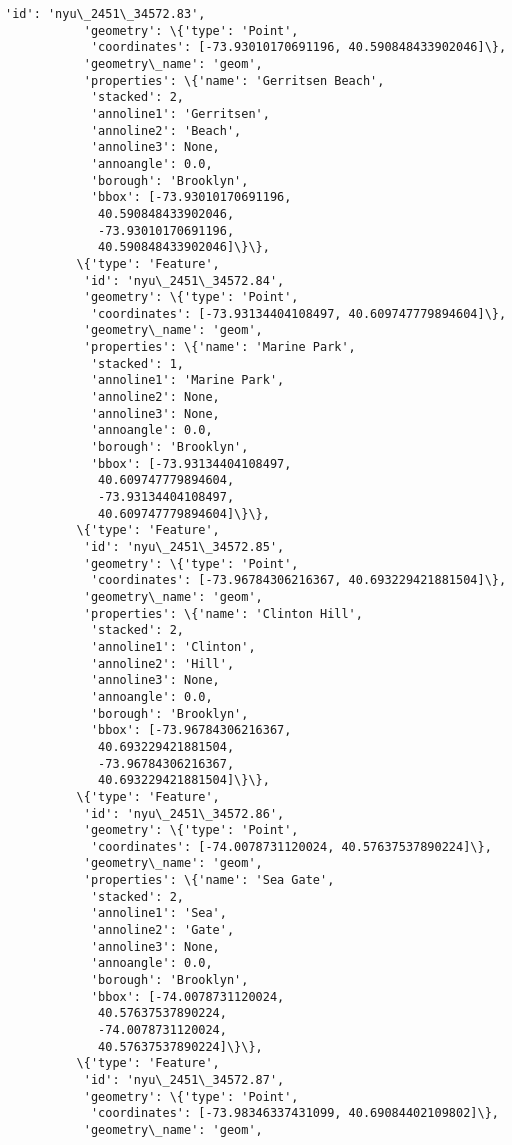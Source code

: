 \documentclass[11pt]{article}
\begin{document}
\begin{Verbatim}[commandchars=\\\{\}]
           'id': 'nyu\_2451\_34572.83',
           'geometry': \{'type': 'Point',
            'coordinates': [-73.93010170691196, 40.590848433902046]\},
           'geometry\_name': 'geom',
           'properties': \{'name': 'Gerritsen Beach',
            'stacked': 2,
            'annoline1': 'Gerritsen',
            'annoline2': 'Beach',
            'annoline3': None,
            'annoangle': 0.0,
            'borough': 'Brooklyn',
            'bbox': [-73.93010170691196,
             40.590848433902046,
             -73.93010170691196,
             40.590848433902046]\}\},
          \{'type': 'Feature',
           'id': 'nyu\_2451\_34572.84',
           'geometry': \{'type': 'Point',
            'coordinates': [-73.93134404108497, 40.609747779894604]\},
           'geometry\_name': 'geom',
           'properties': \{'name': 'Marine Park',
            'stacked': 1,
            'annoline1': 'Marine Park',
            'annoline2': None,
            'annoline3': None,
            'annoangle': 0.0,
            'borough': 'Brooklyn',
            'bbox': [-73.93134404108497,
             40.609747779894604,
             -73.93134404108497,
             40.609747779894604]\}\},
          \{'type': 'Feature',
           'id': 'nyu\_2451\_34572.85',
           'geometry': \{'type': 'Point',
            'coordinates': [-73.96784306216367, 40.693229421881504]\},
           'geometry\_name': 'geom',
           'properties': \{'name': 'Clinton Hill',
            'stacked': 2,
            'annoline1': 'Clinton',
            'annoline2': 'Hill',
            'annoline3': None,
            'annoangle': 0.0,
            'borough': 'Brooklyn',
            'bbox': [-73.96784306216367,
             40.693229421881504,
             -73.96784306216367,
             40.693229421881504]\}\},
          \{'type': 'Feature',
           'id': 'nyu\_2451\_34572.86',
           'geometry': \{'type': 'Point',
            'coordinates': [-74.0078731120024, 40.57637537890224]\},
           'geometry\_name': 'geom',
           'properties': \{'name': 'Sea Gate',
            'stacked': 2,
            'annoline1': 'Sea',
            'annoline2': 'Gate',
            'annoline3': None,
            'annoangle': 0.0,
            'borough': 'Brooklyn',
            'bbox': [-74.0078731120024,
             40.57637537890224,
             -74.0078731120024,
             40.57637537890224]\}\},
          \{'type': 'Feature',
           'id': 'nyu\_2451\_34572.87',
           'geometry': \{'type': 'Point',
            'coordinates': [-73.98346337431099, 40.69084402109802]\},
           'geometry\_name': 'geom',

\end{Verbatim}
\end{document}
